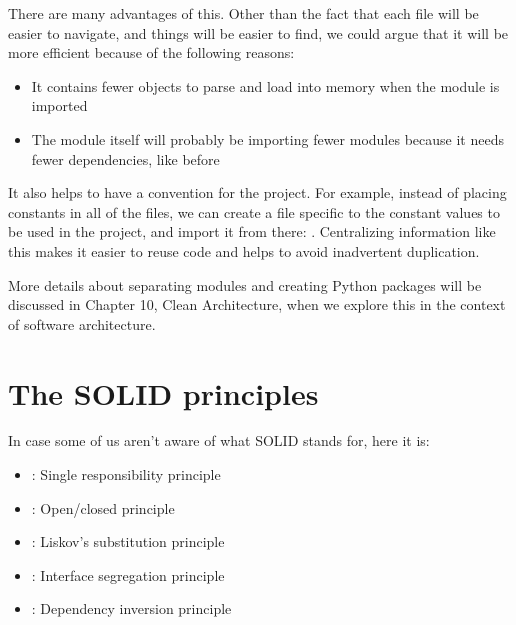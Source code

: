 \documentclass[a4paper,10pt,english]{sphinxmanual}
\begin{document}
There are many advantages of this. Other than the fact that each file will be easier to navigate, and things
will be easier to find, we could argue that it will be more efficient because of the following reasons:
\begin{itemize}
\item {} 
It contains fewer objects to parse and load into memory when the module is imported

\item {} 
The module itself will probably be importing fewer modules because it needs fewer dependencies, like before

\end{itemize}

It also helps to have a convention for the project. For example, instead of placing constants in all of the
files, we can create a file specific to the constant values to be used in the project, and import it from
there: . Centralizing information like this makes it
easier to reuse code and helps to avoid inadvertent duplication.

More details about separating modules and creating Python packages will be discussed in
Chapter 10, Clean Architecture, when we explore this in the context of software architecture.


\chapter{The SOLID principles}
\label{\detokenize{chapters/4_solid_principles/index:the-solid-principles}}\label{\detokenize{chapters/4_solid_principles/index::doc}}
In case some of us aren’t aware of what SOLID stands for, here it is:
\begin{itemize}
\item {} 
: Single responsibility principle

\item {} 
: Open/closed principle

\item {} 
: Liskov’s substitution principle

\item {} 
: Interface segregation principle

\item {} 
: Dependency inversion principle

\end{itemize}
\end{document}
